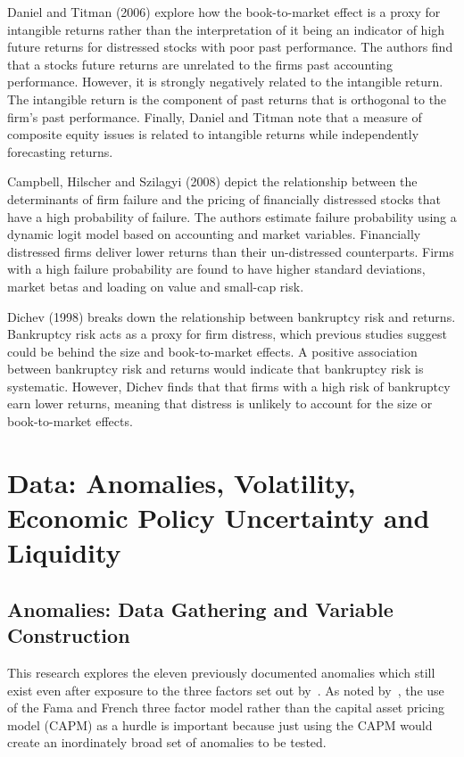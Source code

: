 \documentclass[a4paper,12pt]{article}                 %
\begin{document}
Daniel and Titman (2006) explore how the book-to-market effect is a proxy for intangible returns rather than the interpretation of it being an indicator of high future returns for distressed stocks with poor past performance. The authors find that a stocks future returns are unrelated to the firms past accounting performance. However, it is strongly negatively related to the intangible return. The intangible return is the component of past returns that is orthogonal to the firm’s past performance. Finally, Daniel and Titman note that a measure of composite equity issues is related to intangible returns while independently forecasting returns. 

Campbell, Hilscher and Szilagyi (2008) depict the relationship between the determinants of firm failure and the pricing of financially distressed stocks that have a high probability of failure. The authors estimate failure probability using a dynamic logit model based on accounting and market variables. Financially distressed firms deliver lower returns than their un-distressed counterparts. Firms with a high failure probability are found to have higher standard deviations, market betas and loading on value and small-cap risk. 

Dichev (1998) breaks down the relationship between bankruptcy risk and returns. Bankruptcy risk acts as a proxy for firm distress, which previous studies suggest could be behind the size and book-to-market effects. A positive association between bankruptcy risk and returns would indicate that bankruptcy risk is systematic. However, Dichev finds that that firms with a high risk of bankruptcy earn lower returns, meaning that distress is unlikely to account for the size or book-to-market effects. 

\section{Data: Anomalies, Volatility, Economic Policy Uncertainty and Liquidity}
\subsection{Anomalies: Data Gathering and Variable Construction}
This research explores the eleven previously documented anomalies which still exist even after exposure to the three factors set out by~\cite{fama1993common}. As noted by~\cite{stambaugh2012short}, the use of the Fama and French three factor model rather than the capital asset pricing model (CAPM) as a hurdle is important because just using the CAPM would create an inordinately broad set of anomalies to be tested. 
\end{document}
